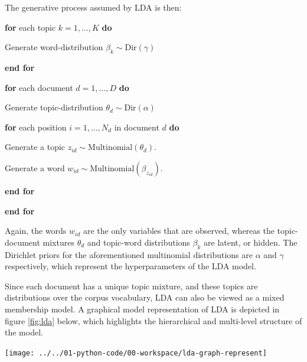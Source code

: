 \documentclass[11pt,preprint, authoryear]{article}
\let\origfigure\figure
\let\endorigfigure\endfigure
\renewenvironment{figure}[1][2] {
    \expandafter\origfigure\expandafter[H]
} {
    \endorigfigure
}
\begin{document}

The generative process assumed by LDA is then: \newline


\textbf{for} each topic \(k = 1, ..., K\) \textbf{do}

\quad Generate word-distribution \(\beta_k \sim \text{Dir}(\gamma)\)

\textbf{end for}

\textbf{for} each document \(d = 1, ..., D\) \textbf{do}

\quad Generate topic-distribution \(\theta_d \sim \text{Dir}(\alpha)\)

\quad \textbf{for} each position \(i = 1, ..., N_d\) in document \(d\)
\textbf{do}

\quad \quad Generate a topic
\(z_{id} \sim \text{Multinomial}(\theta_d)\).

\quad \quad Generate a word
\(w_{id} \sim \text{Multinomial}(\beta_{z_{id}})\).

\quad \textbf{end for}

\textbf{end for} \newline


Again, the words \(w_{id}\) are the only variables that are observed,
whereas the topic-document mixtures \(\theta_d\) and topic-word
distributions \(\beta_k\) are latent, or hidden. The Dirichlet priors
for the aforementioned multinomial distributions are \(\alpha\) and
\(\gamma\) respectively, which represent the hyperparameters of the LDA
model.

Since each document has a unique topic mixture, and these topics are
distributions over the corpus vocabulary, LDA can also be viewed as a
mixed membership model. A graphical model representation of LDA is
depicted in figure \ref{fig:lda} below, which highlights the
hierarchical and multi-level structure of the model.

\footnotesize

\begin{figure}
\caption{\textbf{A Probabilistic Graphical Model of LDA}}
\label{fig:lda}

\texttt{[image: ../../01-python-code/00-workspace/lda-graph-represent]} 
\\ 
\end{figure}
\end{document}
